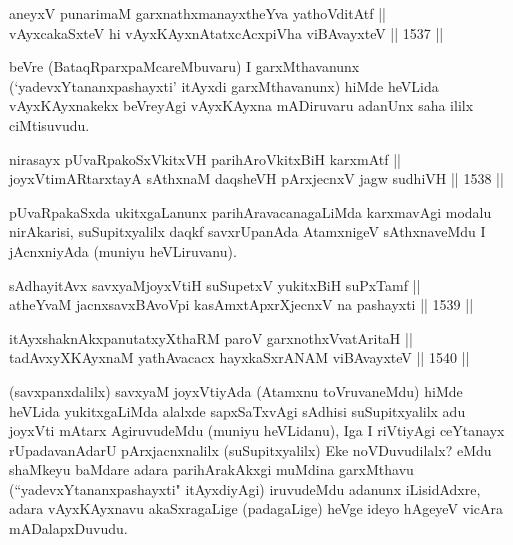

\begin{shl}
aneyxV punarimaM garxnathxmanayxtheYva yathoVditAtf ||  \\
vAyxcakaSxteV hi vAyxKAyxnAtatxcAcxpiVha viBAvayxteV \hfill || 1537 ||  
\end{shl}

\begin{artha}
beVre (BataqRparxpaMcareMbuvaru) I garxMthavanunx (`yadevxYtananxpashayxti' itAyxdi garxMthavanunx) hiMde heVLida vAyxKAyxnakekx beVreyAgi vAyxKAyxna mADiruvaru adanUnx saha ililx ciMtisuvudu.
\end{artha}


\begin{shl}
nirasayx pUvaRpakoSxVkitxVH parihAroVkitxBiH karxmAtf || \\
joyxVtimARtarxtayA sAthxnaM daqsheVH pArxjecnxV jagw sudhiVH \hfill || 1538 ||  
\end{shl}

\begin{artha}
pUvaRpakaSxda ukitxgaLanunx parihAravacanagaLiMda karxmavAgi modalu nirAkarisi, suSupitxyalilx daqkf savxrUpanAda AtamxnigeV sAthxnaveMdu I jAcnxniyAda (muniyu heVLiruvanu).
\end{artha}


\begin{shl}
sAdhayitAvx savxyaMjoyxVtiH suSupetxV yukitxBiH suPxTamf || \\
atheYvaM jacnxsavxBAvoV\s pi kasAmxtApxrXjecnxV na pashayxti \hfill || 1539 ||  
\end{shl}
				
\begin{shl}
itAyxshaknAkxpanutatxyXthaRM paroV garxnothxV\s vatAritaH || \\
tadAvxyXKAyxnaM yathAvacacx hayxkaSxrANAM viBAvayxteV \hfill || 1540 ||  
\end{shl}


\begin{artha}
(savxpanxdalilx) savxyaM joyxVtiyAda (Atamxnu toVruvaneMdu) hiMde heVLida yukitxgaLiMda alalxde sapxSaTxvAgi sAdhisi suSupitxyalilx adu joyxVti mAtarx AgiruvudeMdu (muniyu heVLidanu), Iga I riVtiyAgi ceYtanayx rUpadavanAdarU pArxjacnxnalilx (suSupitxyalilx) Eke noVDuvudilalx? eMdu shaMkeyu baMdare adara parihArakAkxgi muMdina garxMthavu (``yadevxYtananxpashayxti" itAyxdiyAgi) iruvudeMdu adanunx iLisidAdxre, adara vAyxKAyxnavu akaSxragaLige (padagaLige) heVge ideyo hAgeyeV vicAra mADalapxDuvudu.
\end{artha}

